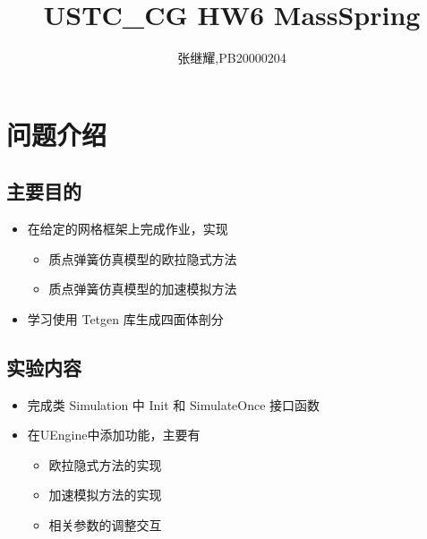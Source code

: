 \documentclass{article}
\title{USTC\_CG HW6 MassSpring}
\author{张继耀,PB20000204}
\begin{document}
	\maketitle
	
	\tableofcontents
	
	\section {问题介绍}
	\subsection{主要目的}
	
		\begin{itemize}
		\item 在给定的网格框架上完成作业，实现
			\begin{itemize}[label=$\circ$, itemjoin=\hspace{0.5em}]
			\item 质点弹簧仿真模型的欧拉隐式方法
			\item 质点弹簧仿真模型的加速模拟方法
		\end{itemize}
	\end{itemize}

	\begin{itemize}
	\item 学习使用 Tetgen 库生成四面体剖分
\end{itemize}
	
	\subsection{实验内容}
	
	\begin{itemize}
	\item 	完成类 Simulation 中 Init 和 SimulateOnce 接口函数
\end{itemize}

	\begin{itemize}
	\item  在UEngine中添加功能，主要有
	\begin{itemize}[label=$\circ$, itemjoin=\hspace{0.5em}]
		\item 欧拉隐式方法的实现
		\item 加速模拟方法的实现
		\item  相关参数的调整交互
	\end{itemize}
\end{itemize}
	
\end{document}
